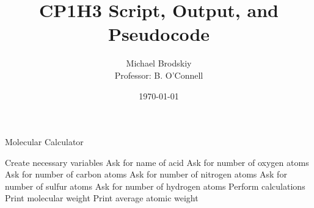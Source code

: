 


\title{CP1H3 Script, Output, and Pseudocode}
\date{\today}
\author{Michael Brodskiy\\ \small Professor: B. O'Connell}



\maketitle

    \begin{algorithm}
      \caption{Molecular Calculator}\label{1}
      \begin{algorithmic}[1]
        \State Create necessary variables
            \State Ask for name of acid
            \State Ask for number of oxygen atoms
            \State Ask for number of carbon atoms
            \State Ask for number of nitrogen atoms
            \State Ask for number of sulfur atoms
            \State Ask for number of hydrogen atoms
            \State Perform calculations
            \State Print molecular weight
            \State Print average atomic weight
      \end{algorithmic}
    \end{algorithm}








